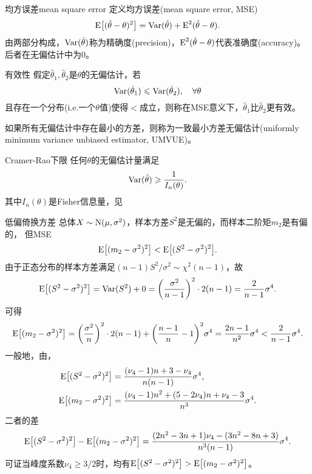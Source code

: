 \begin{definition}{均方误差}{mean square error}
	定义均方误差(mean square error, MSE)
	\begin{equation}
		\operatorname{E}\bigl[(\hat\theta-\theta)^2\bigr]=\operatorname{Var}(\hat\theta)+\operatorname{E}^2(\hat\theta-\theta).
	\end{equation}
	由两部分构成，$\operatorname{Var}(\hat\theta)$称为精确度(precision)，$\operatorname{E}^2(\hat\theta-\theta)$代表准确度(accuracy)。后者在无偏估计中为0。
\end{definition}
\begin{definition}{有效性}{}
	假定$\hat\theta_1,\hat\theta_2$是$\theta$的无偏估计，若
	\[
		\operatorname{Var}(\hat\theta_1)\leqslant\operatorname{Var}(\hat\theta_2),\quad\forall\theta
	\]
	且存在一个分布(i.e.一个$\theta$值)使得$<$成立，则称在MSE意义下，$\hat\theta_1$比$\hat\theta_2$更有效。
	
	如果所有无偏估计中存在最小的方差，则称为一致最小方差无偏估计(uniformly minimum variance unbiased estimator, UMVUE)。
\end{definition}
\begin{theorem}{Cramer-Rao下限}{}
	任何$\theta$的无偏估计量满足
	\begin{equation}
		\operatorname{Var}(\hat\theta)\geqslant\frac1{I_n(\theta)}.
	\end{equation}
	其中$I_n(\theta)$是Fisher信息量，见
\end{theorem}
\begin{example}{低偏倚换方差}{}
	总体$X\sim\operatorname{N}(\mu,\sigma^2)$，样本方差$S^2$是无偏的，而样本二阶矩$m_2$是有偏的，
	但MSE
	\[
		\operatorname{E}\bigl[(m_2-\sigma^2)^2\bigr]<\operatorname{E}\bigl[(S^2-\sigma^2)^2\bigr].
	\]
	由于正态分布的样本方差满足$(n-1)S^2/\sigma^2\sim\chi^2(n-1)$，故
	\begin{equation}
		\operatorname{E}\bigl[(S^2-\sigma^2)^2\bigr]=\operatorname{Var}(S^2)+0=\biggl(\frac{\sigma^2}{n-1}\biggr)^2\cdot 2(n-1)=\frac{2}{n-1}\sigma^4.
	\end{equation}
	可得
	\[
		\operatorname{E}\bigl[(m_2-\sigma^2)^2\bigr]=\biggl(\frac{\sigma^2}{n}\biggr)^2\cdot 2(n-1)+\biggl(\frac{n-1}n-1\biggr)^2\sigma^4=\frac{2n-1}{n^2}\sigma^4<\frac{2}{n-1}\sigma^4.
	\]
	\tcblower
	一般地，由，
	\begin{align*}
		\operatorname{E}\bigl[(S^2-\sigma^2)^2\bigr]&=\frac{(\nu_4-1)n+3-\nu_4}{n(n-1)}\sigma^4,\\
		\operatorname{E}\bigl[(m_2-\sigma^2)^2\bigr]&=\frac{(\nu_4-1)n^2+(5-2\nu_4)n+\nu_4-3}{n^3}\sigma^4.
	\end{align*}
	二者的差
	\[
		\operatorname{E}\bigl[(S^2-\sigma^2)^2\bigr]-\operatorname{E}\bigl[(m_2-\sigma^2)^2\bigr]
		=\frac{(2n^2-3n+1)\nu_4-(3n^2-8n+3)}{n^3(n-1)}\sigma^4.
	\]
	可证当峰度系数$\nu_4\geqslant 3/2$时，均有$\operatorname{E}\bigl[(S^2-\sigma^2)^2\bigr]>\operatorname{E}\bigl[(m_2-\sigma^2)^2\bigr]$。
\end{example}


